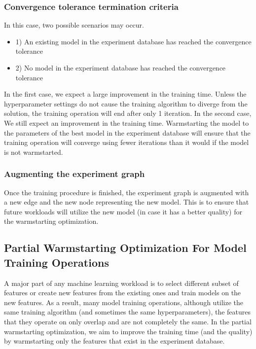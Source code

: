 \subsubsection{Convergence tolerance termination criteria}
In this case, two possible scenarios may occur.
\begin{itemize}
\item 1) An existing model in the experiment database has reached the convergence tolerance
\item 2) No model in the experiment database has reached the convergence tolerance
\end{itemize}
In the first case, we expect a large improvement in the training time. 
Unless the hyperparameter settings do not cause the training algorithm to diverge from the solution, the training operation will end after only 1 iteration.
In the second case, We still expect an improvement in the training time.
Warmstarting the model to the parameters of the best model in the experiment database will ensure that the training operation will converge using fewer iterations than it would if the model is not warmstarted.

\subsubsection{Augmenting the experiment graph}
Once the training procedure is finished, the experiment graph is augmented with a new edge and the new node representing the new model.
This is to ensure that future workloads will utilize the new model (in case it has a better quality) for the warmstarting optimization.

\subsection{Partial Warmstarting Optimization For Model Training Operations}
A major part of any machine learning workload is to select different subset of features or create new features from the existing ones and train models on the new features.
As a result, many model training operations, although utilize the same training algorithm (and sometimes the same hyperparameters), the features that they operate on only overlap and are not completely the same.
In the partial warmstarting optimization, we aim to improve the training time (and the quality) by warmstarting only the features that exist in the experiment database.


